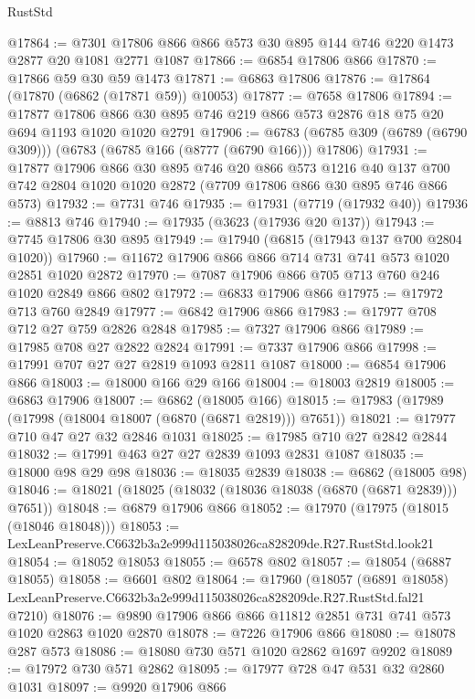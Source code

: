 \begin{lexlean}{RustStd}
\begin{coremodule}
@17864 := @7301 @17806 @866 @866 @573 @30 @895 @144 @746 @220 @1473 @2877 @20 @1081 @2771 @1087
@17866 := @6854 @17806 @866
@17870 := @17866 @59 @30 @59 @1473
@17871 := @6863 @17806
@17876 := @17864 (@17870 (@6862 (@17871 @59)) @10053)
@17877 := @7658 @17806
@17894 := @17877
    @17806
    @866
    @30
    @895
    @746
    @219
    @866
    @573
    @2876
    @18
    @75
    @20
    @694
    @1193
    @1020
    @1020
    @2791
@17906 := @6783 (@6785 @309 (@6789 (@6790 @309))) (@6783 (@6785 @166 (@8777 (@6790 @166))) @17806)
@17931 := @17877
    @17906
    @866
    @30
    @895
    @746
    @20
    @866
    @573
    @1216
    @40
    @137
    @700
    @742
    @2804
    @1020
    @1020
    @2872
    (@7709 @17806 @866 @30 @895 @746 @866 @573)
@17932 := @7731 @746
@17935 := @17931 (@7719 (@17932 @40))
@17936 := @8813 @746
@17940 := @17935 (@3623 (@17936 @20 @137))
@17943 := @7745 @17806 @30 @895
@17949 := @17940 (@6815 (@17943 @137 @700 @2804 @1020))
@17960 := @11672 @17906 @866 @866 @714 @731 @741 @573 @1020 @2851 @1020 @2872
@17970 := @7087 @17906 @866 @705 @713 @760 @246 @1020 @2849 @866 @802
@17972 := @6833 @17906 @866
@17975 := @17972 @713 @760 @2849
@17977 := @6842 @17906 @866
@17983 := @17977 @708 @712 @27 @759 @2826 @2848
@17985 := @7327 @17906 @866
@17989 := @17985 @708 @27 @2822 @2824
@17991 := @7337 @17906 @866
@17998 := @17991 @707 @27 @27 @2819 @1093 @2811 @1087
@18000 := @6854 @17906 @866
@18003 := @18000 @166 @29 @166
@18004 := @18003 @2819
@18005 := @6863 @17906
@18007 := @6862 (@18005 @166)
@18015 := @17983 (@17989 (@17998 (@18004 @18007 (@6870 (@6871 @2819))) @7651))
@18021 := @17977 @710 @47 @27 @32 @2846 @1031
@18025 := @17985 @710 @27 @2842 @2844
@18032 := @17991 @463 @27 @27 @2839 @1093 @2831 @1087
@18035 := @18000 @98 @29 @98
@18036 := @18035 @2839
@18038 := @6862 (@18005 @98)
@18046 := @18021 (@18025 (@18032 (@18036 @18038 (@6870 (@6871 @2839))) @7651))
@18048 := @6879 @17906 @866
@18052 := @17970 (@17975 (@18015 (@18046 @18048)))
@18053 := LexLeanPreserve.C6632b3a2e999d115038026ca828209de.R27.RustStd.look21
@18054 := @18052 @18053
@18055 := @6578 @802
@18057 := @18054 (@6887 @18055)
@18058 := @6601 @802
@18064 := @17960
    (@18057
      (@6891 @18058)
      LexLeanPreserve.C6632b3a2e999d115038026ca828209de.R27.RustStd.fal21
      @7210)
@18076 := @9890 @17906 @866 @866 @11812 @2851 @731 @741 @573 @1020 @2863 @1020 @2870
@18078 := @7226 @17906 @866
@18080 := @18078 @287 @573
@18086 := @18080 @730 @571 @1020 @2862 @1697 @9202
@18089 := @17972 @730 @571 @2862
@18095 := @17977 @728 @47 @531 @32 @2860 @1031
@18097 := @9920 @17906 @866

\end{coremodule}
\end{lexlean}
